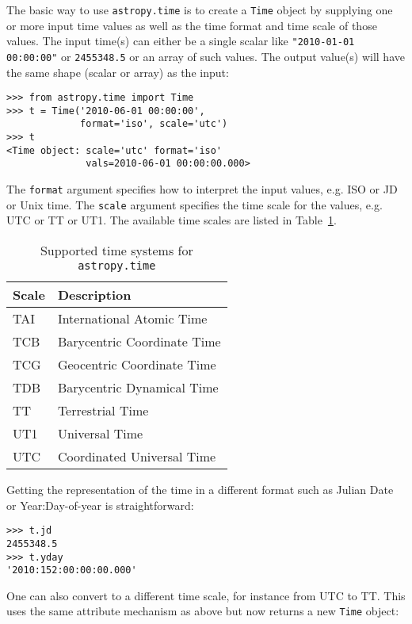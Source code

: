 \documentclass[traditabstract]{aa}
\begin{document}
The basic way to use \texttt{astropy.time} is to create a \texttt{Time} object
by supplying one or more input time values as well as the time format and time
scale of those values.  The input time(s) can either be a single scalar like
\verb|"2010-01-01 00:00:00"| or \verb|2455348.5| or an array of such values.
The output value(s) will have the same shape (scalar or array) as the input:

\begin{verbatim}
>>> from astropy.time import Time
>>> t = Time('2010-06-01 00:00:00',
             format='iso', scale='utc')
>>> t
<Time object: scale='utc' format='iso'
              vals=2010-06-01 00:00:00.000>

\end{verbatim}

The \texttt{format} argument specifies how to interpret the input values, e.g.
ISO or JD or Unix time. The \texttt{scale} argument specifies the time scale
for the values, e.g. UTC or TT or UT1. The available time scales are listed in
Table~\ref{tab:time_systems}.

\begin{table}
\caption{Supported time systems for \texttt{astropy.time}\label{tab:time_systems}}
\center
\begin{tabular}{ll}
\hline
Scale  & Description \\
\hline
TAI    & International Atomic Time \\
TCB    & Barycentric Coordinate Time \\
TCG    & Geocentric Coordinate Time \\
TDB    & Barycentric Dynamical Time \\
TT     & Terrestrial Time \\
UT1    & Universal Time \\
UTC    & Coordinated Universal Time \\
\hline
\end{tabular}
\end{table}

Getting the representation of the time in a different format such as Julian
Date or Year:Day-of-year is straightforward:

\begin{verbatim}
>>> t.jd
2455348.5
>>> t.yday
'2010:152:00:00:00.000'
\end{verbatim}

One can also convert to a different time scale, for instance from UTC to
TT.  This uses the same attribute mechanism as above but now returns a new
\texttt{Time} object:
\end{document}
